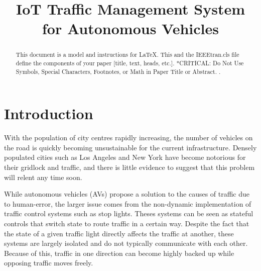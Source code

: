 \documentclass[conference]{IEEEtran}
\begin{document}
\title{IoT Traffic Management System for Autonomous Vehicles}

\author{
\and
{}
}

\maketitle
\thispagestyle{plain}
\pagestyle{plain}

\begin{abstract}
This document is a model and instructions for \LaTeX.
This and the IEEEtran.cls file define the components of your paper [title, text, heads, etc.]. *CRITICAL: Do Not Use Symbols, Special Characters, Footnotes, 
or Math in Paper Title or Abstract. \cite{Chong}\cite{Rizwan}\cite{Avetifipour}\cite{GOTTLICH}\cite{Ghena}.
\end{abstract}

\section{Introduction}

With the population of city centres rapidly increasing, the number of vehicles on the road is quickly becoming unsustainable for the current infrastructure. Densely populated cities such as Los Angeles and New York have become notorious for their gridlock and traffic, and there is little evidence to suggest that this problem will relent any time soon. 

While autonomous vehicles (AVs) propose a solution to the causes of traffic due to human-error, the larger issue comes from the non-dynamic implementation of traffic control systems such as stop lights. Theses systems can be seen as stateful controls that switch state to route traffic in a certain way. Despite the fact that the state of a given traffic light directly affects the traffic at another, these systems are largely isolated and do not typically communicate with each other. Because of this, traffic in one direction can become highly backed up while opposing traffic moves freely. 
\end{document}
